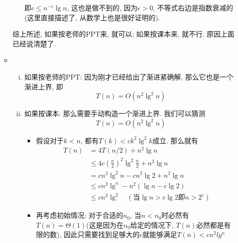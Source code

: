 \documentclass[UTF8]{article}
\begin{document}
\begin{enumerate}[1.]
\begin{itemize}
\begin{enumerate}[(1). ]
			即$c\le n^{-\epsilon} \lg n$, 这也是做不到的, 因为$\epsilon>0$, 不等式右边是指数衰减的(这里直接描述了, 从数学上也是很好证明的).
		\end{enumerate}
		综上所述, 如果按老师的PPT来, 就可以; 如果按课本来, 就不行. 原因上面已经说清楚了.
	\item 
		\begin{enumerate}[i.]
		\item 如果按老师的PPT: 因为刚才已经给出了渐进紧确解, 那么它也是一个渐进上界, 即$$T(n)=O(n^2\lg^2n)$$
		\item 如果按课本: 那么需要手动构造一个渐进上界. 我们可以猜测
		$$T(n)=O(n^2\lg^2n)$$
		\begin{itemize}
		\item 假设对于$k<n$, 都有$T(k)<ck^2\lg^2k$成立. 那么就有
		\begin{align*}
		T(n)&=4T(n/2)+n^2\lg n\\
		&\le 4c\left(\frac{n}{2}\right)^2\lg^2\frac{n}{2}+n^2\lg n\\
		&=cn^2\lg^2n-cn^2\lg 2+n^2\lg n\\
		&\le cn^2\lg^n-n^2(\lg n-c\lg 2)\\
		&\le cn^2\lg^2\quad(\mbox{当$\lg n>c\lg 2$即$n>2^c$})
		\end{align*}
		\item 再考虑初始情况: 对于合适的$n_0$, 当$n<n_0$时必然有$T(n)=\Theta(1)$(这是因为在$n_0$给定的情况下, $T(n)$必然都是有限的数), 因此只需要找到足够大的$c$就能够满足$T(n)<cn^2lg^n$
		\end{itemize}
		\end{enumerate}
	
	\end{itemize}
\end{enumerate}
\end{document}
